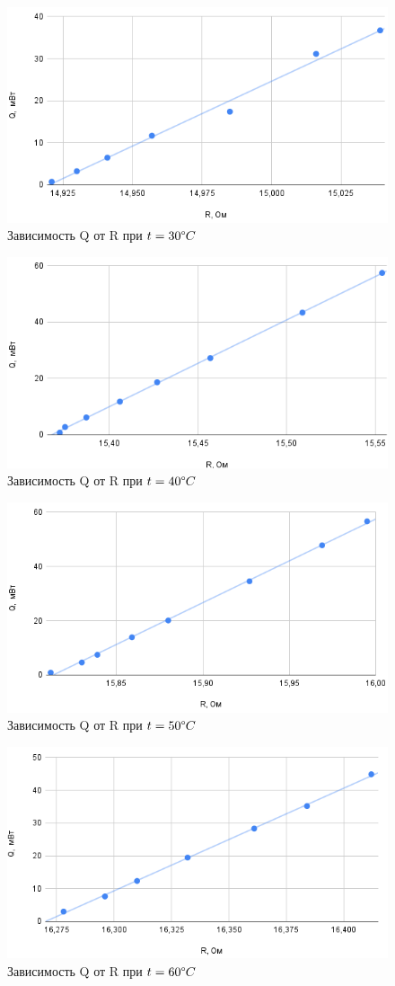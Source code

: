 \documentclass[a4paper,12pt]{article}
\begin{document}
\begin{figure}[h]
    \centering
    \includegraphics[width=0.7\linewidth]{t=30.png}
    \caption{Зависимость Q от R при $t=30\degree C$}
    \label{fig:my_label}
\end{figure}
\begin{figure}[h]
    \centering
    \includegraphics[width=0.7\linewidth]{t=40.png}
    \caption{Зависимость Q от R при $t=40\degree C$}
    \label{fig:my_label}
\end{figure}
\begin{figure}[h]
    \centering
    \includegraphics[width=0.7\linewidth]{t=50.png}
    \caption{Зависимость Q от R при $t=50\degree C$}
    \label{fig:my_label}
\end{figure}
\begin{figure}[h]
    \centering
    \includegraphics[width=0.7\linewidth]{t=60.png}
    \caption{Зависимость Q от R при $t=60\degree C$}
    \label{fig:my_label}
\end{figure}
\end{document}
